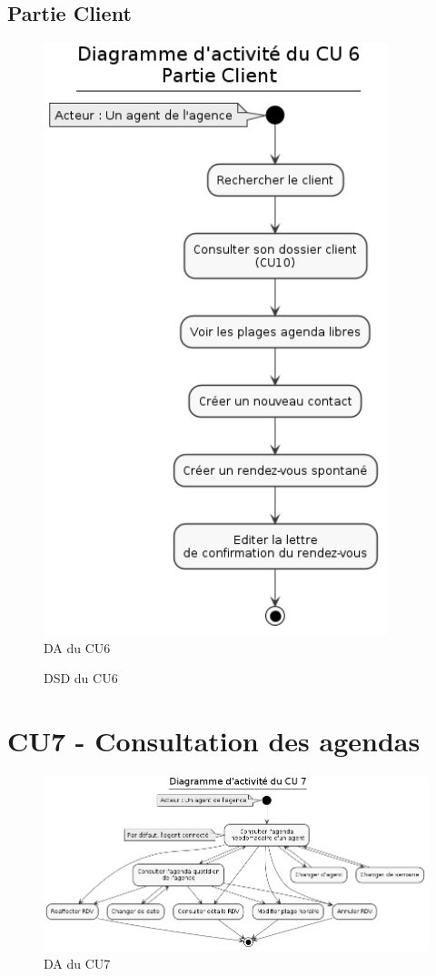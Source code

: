 \subsection{Partie Client}
\begin{figure}[H]
\centering
\includegraphics[width=10cm]{figures/DA_CU6_partieClient.png}
\caption{DA du CU6}
\end{figure}

\begin{figure}[H]
\centering
\caption{DSD du CU6}
\end{figure}

\clearpage
\section{CU7 - Consultation des agendas}
\begin{figure}[H]
\centering
\includegraphics[width=\textwidth]{figures/DA_CU7.png}
\caption{DA du CU7}
\end{figure}

